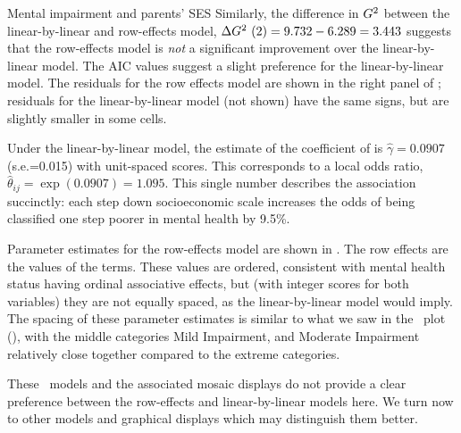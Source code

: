 \begin{Example}[mental2]{Mental impairment and parents' SES}
Similarly, the difference in $G^2$ between the linear-by-linear
and row-effects model, $\Delta G^2\ (2) = 9.732-6.289 = 3.443$ suggests that the 
row-effects model
is \emph{not} a significant improvement over the
linear-by-linear model.
The AIC values suggest a slight preference for the linear-by-linear model.
The residuals for the row effects model are shown in the right
panel of ; residuals for the linear-by-linear
model (not shown) have the same signs, but are slightly smaller
in some cells.

\begin{Output}[htb]
\caption{Parameter estimates for the row-effects \loglin\ model, Mental health data}\label{out:mental2.1}
\small

\end{Output}

Under the linear-by-linear model, the estimate of the coefficient of
 is $\hat{\gamma} = 0.0907$ (s.e.=0.015) with unit-spaced scores.
This corresponds to a local odds ratio, $\hat{\theta}_{ij} = \exp (0.0907) = 1.095$.
This single number describes the association succinctly:
each step down socioeconomic scale increases the odds of being classified
one step poorer in mental health by 9.5\%.

Parameter estimates for the row-effects model are shown in
.  The row effects are the values of
the  terms.  These values are ordered, consistent with
mental health status having ordinal associative effects,
but (with integer scores for both variables) they are not equally
spaced, as the linear-by-linear model would imply.
The spacing of these parameter estimates is similar to what we saw
in the \CA\ plot (), with the middle categories
Mild Impairment, and Moderate Impairment relatively close together
compared to the extreme categories.

These \loglin\ models and the associated mosaic displays do not
provide a clear preference between the row-effects and linear-by-linear
models here.
We turn now to other models and graphical displays which may distinguish them better.
\end{Example}
